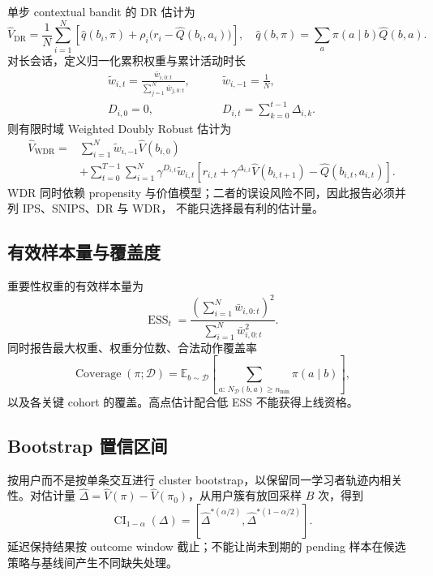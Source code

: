 \documentclass[11pt,a4paper,fontset=none]{ctexart}
\DeclareMathOperator{\ESS}{ESS}
\newcommand{\E}{\mathbb{E}}
\newcommand{\1}{\mathbb{I}}
\newcommand{\D}{\mathcal{D}}
\newcommand{\CI}{\operatorname{CI}}
\begin{document}
单步 contextual bandit 的 DR 估计为
\begin{equation}
  \widehat V_{\mathrm{DR}}=
  \frac1N\sum_{i=1}^{N}\left[
    \widehat q(b_i,\pi)
    +\rho_i\bigl(r_i-\widehat Q(b_i,a_i)\bigr)
  \right],
  \quad
  \widehat q(b,\pi)=\sum_a\pi(a\mid b)\widehat Q(b,a).
  \label{eq:dr}
\end{equation}
对长会话，定义归一化累积权重与累计活动时长
\begin{align}
  \widetilde w_{i,t}=
  \frac{\bar w_{i,0:t}}{\sum_{j=1}^{N}\bar w_{j,0:t}},
  \qquad &\widetilde w_{i,-1}=\frac1N,\\
  D_{i,0}=0,\qquad &D_{i,t}=\sum_{k=0}^{t-1}\Delta_{i,k}.
\end{align}
则有限时域 Weighted Doubly Robust 估计为
\begin{align}
  \widehat V_{\mathrm{WDR}}={}&
  \sum_{i=1}^{N}\widetilde w_{i,-1}\widehat V(b_{i,0})\nonumber\\
  &+\sum_{t=0}^{T-1}\sum_{i=1}^{N}\gamma^{D_{i,t}}
  \widetilde w_{i,t}
  \left[r_{i,t}+\gamma^{\Delta_{i,t}}\widehat V(b_{i,t+1})
  -\widehat Q(b_{i,t},a_{i,t})\right].
  \label{eq:wdr}
\end{align}
WDR 同时依赖 propensity 与价值模型；二者的误设风险不同，因此报告必须并列 IPS、SNIPS、DR 与 WDR，
不能只选择最有利的估计量。

\subsection{有效样本量与覆盖度}

重要性权重的有效样本量为
\begin{equation}
  \ESS_t=\frac{\left(\sum_{i=1}^{N}\bar w_{i,0:t}\right)^2}
  {\sum_{i=1}^{N}\bar w_{i,0:t}^2}.
  \label{eq:ess}
\end{equation}
同时报告最大权重、权重分位数、合法动作覆盖率
\begin{equation}
  \operatorname{Coverage}(\pi;\D)=
  \E_{b\sim\D}\left[
    \sum_{a:\,N_\D(b,a)\ge n_{\min}}\pi(a\mid b)
  \right],
  \label{eq:coverage}
\end{equation}
以及各关键 cohort 的覆盖。高点估计配合低 ESS 不能获得上线资格。

\subsection{Bootstrap 置信区间}

按用户而不是按单条交互进行 cluster bootstrap，以保留同一学习者轨迹内相关性。对估计量
$\widehat\Delta=\widehat V(\pi)-\widehat V(\pi_0)$，从用户簇有放回采样 $B$ 次，得到
\begin{equation}
  \CI_{1-\alpha}(\Delta)=
  \left[
    \widehat\Delta^{*(\alpha/2)},
    \widehat\Delta^{*(1-\alpha/2)}
  \right].
  \label{eq:bootstrap-ci}
\end{equation}
延迟保持结果按 outcome window 截止；不能让尚未到期的 pending 样本在候选策略与基线间产生不同缺失处理。
\end{document}
